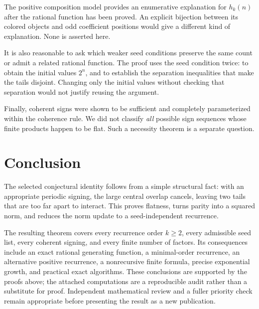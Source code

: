 \documentclass[11pt]{article}
\numberwithin{equation}{section}
\theoremstyle{definition}
\theoremstyle{remark}
\begin{document}
The positive composition model provides an enumerative explanation for
$h_k(n)$ after the rational function has been proved. An explicit bijection
between its colored objects and odd coefficient positions would give a
different kind of explanation. None is asserted here.

It is also reasonable to ask which weaker seed conditions preserve the
same count or admit a related rational function. The proof uses the seed
condition twice: to obtain the initial values $2^n$, and to establish the
separation inequalities that make the tails disjoint. Changing only the
initial values without checking that separation would not justify reusing
the argument.

Finally, coherent signs were shown to be sufficient and completely
parameterized within the coherence rule. We did not classify \emph{all}
possible sign sequences whose finite products happen to be flat. Such a
necessity theorem is a separate question.

\section{Conclusion}
The selected conjectural identity follows from a simple structural fact:
with an appropriate periodic signing, the large central overlap cancels,
leaving two tails that are too far apart to interact. This proves flatness,
turns parity into a squared norm, and reduces the norm update to a
seed-independent recurrence.

The resulting theorem covers every recurrence order $k\ge2$, every
admissible seed list, every coherent signing, and every finite number of
factors. Its consequences include an exact rational generating function,
a minimal-order recurrence, an alternative positive recurrence, a
nonrecursive finite formula, precise exponential growth, and practical
exact algorithms. These conclusions are supported by the proofs above;
the attached computations are a reproducible audit rather than a
substitute for proof. Independent mathematical review and a fuller
priority check remain appropriate before presenting the result as a new
publication.

\appendix
\end{document}
